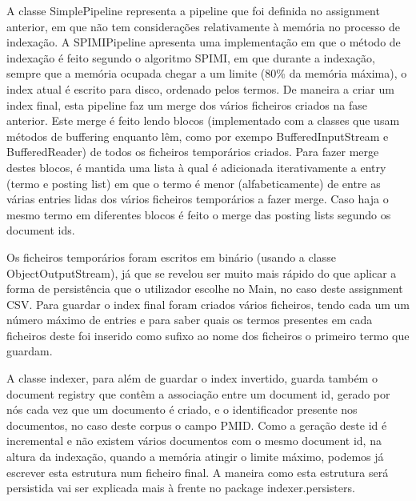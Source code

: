 \documentclass[12pt]{article}
\begin{document}
A classe SimplePipeline representa a pipeline que foi definida no
assignment anterior, em que não tem considerações relativamente à
memória no processo de indexação. A SPIMIPipeline apresenta uma
implementação em que o método de indexação é feito segundo o
algoritmo SPIMI, em que durante a indexação, sempre que a memória
ocupada chegar a um limite (80\% da memória máxima), o index atual
é escrito para disco, ordenado pelos termos. De maneira a criar um index
final, esta pipeline faz um merge dos vários ficheiros criados na
fase anterior. Este merge é feito lendo blocos (implementado com a
classes que usam métodos de buffering enquanto lêm, como por exempo
BufferedInputStream e BufferedReader) de todos os ficheiros temporários
criados. Para fazer merge destes blocos, é mantida uma lista à qual é
adicionada iterativamente a entry (termo e posting list) em que o termo é
menor (alfabeticamente) de entre as várias entries lidas dos vários
ficheiros temporários a fazer merge. Caso haja o mesmo termo em
diferentes blocos é feito o merge das posting lists segundo os
document ids.

Os ficheiros temporários foram escritos em binário (usando a classe
ObjectOutputStream), já que se revelou ser muito mais rápido do que
aplicar a forma de persistência que o utilizador escolhe no Main, no
caso deste assignment CSV. Para guardar o index final foram criados
vários ficheiros, tendo cada um um número máximo de entries e para
saber quais os termos presentes em cada ficheiros deste foi inserido
como sufixo ao nome dos ficheiros o primeiro termo que guardam.

A classe indexer, para além de guardar o index invertido, guarda também
o document registry que contêm a associação entre um document id, gerado por nós cada vez que um documento é criado, e o identificador presente nos
documentos, no caso deste corpus o campo PMID. Como a geração deste id é incremental e não existem vários documentos com o mesmo document id, na
altura da indexação, quando a memória atingir o limite máximo, podemos
já escrever esta estrutura num ficheiro final. A maneira como esta
estrutura será persistida vai ser explicada mais à frente no package
indexer.persisters.
\end{document}
